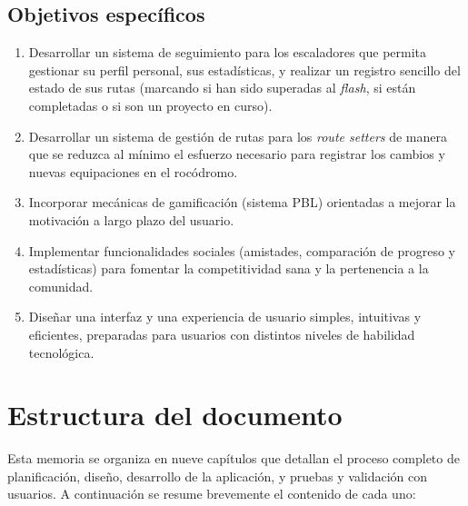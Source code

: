 \subsection{Objetivos específicos}

\begin{enumerate}
	\item Desarrollar un sistema de seguimiento para los escaladores que permita gestionar su perfil personal, sus estadísticas, y 
	realizar un registro sencillo del estado de sus rutas (marcando si han sido superadas al \textit{flash}, si están completadas o 
	si son un proyecto en curso).
	\item Desarrollar un sistema de gestión de rutas para los \textit{route setters} de manera que se reduzca al mínimo el esfuerzo 
	necesario para registrar los cambios y nuevas equipaciones en el rocódromo.
	\item Incorporar mecánicas de gamificación (sistema PBL) orientadas a mejorar la motivación a largo plazo del usuario.
	\item Implementar funcionalidades sociales (amistades, comparación de progreso y estadísticas) para fomentar la competitividad 
	sana y la pertenencia a la comunidad.
	\item Diseñar una interfaz y una experiencia de usuario simples, intuitivas y eficientes, preparadas para usuarios con distintos 
	niveles de habilidad tecnológica.
\end{enumerate}


\section{Estructura del documento}

Esta memoria se organiza en nueve capítulos que detallan el proceso completo de planificación, diseño, desarrollo de la aplicación, 
y pruebas y validación con usuarios. A continuación se resume brevemente el contenido de cada uno:

